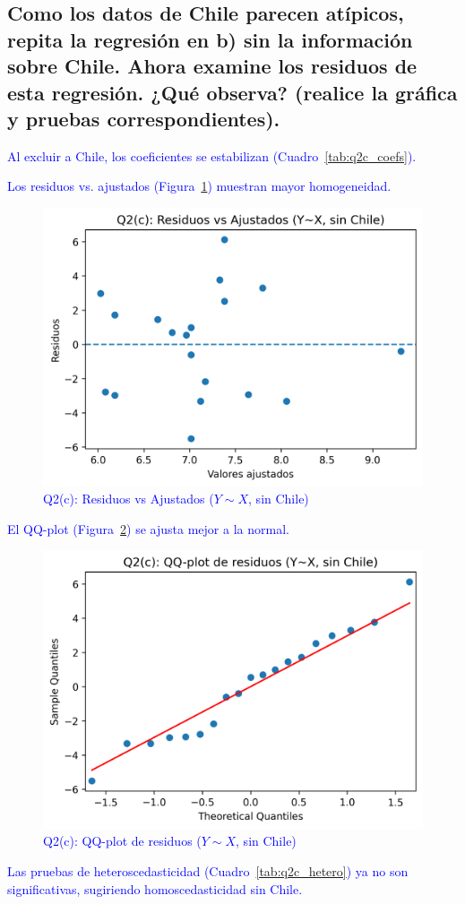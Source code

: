 \documentclass[10pt]{article}
\begin{document}
\subsection{Como los datos de Chile parecen atípicos, repita la regresión en b) sin la información sobre Chile. Ahora examine los residuos de esta regresión. ¿Qué observa? (realice la gráfica y pruebas correspondientes).}
    \textcolor{blue}{
    Al excluir a Chile, los coeficientes se estabilizan (Cuadro~\ref{tab:q2c_coefs}).
    
    Los residuos vs. ajustados (Figura~\ref{fig:q2_c_resid}) muestran mayor homogeneidad.
    \begin{figure}[H]
        \centering
        \includegraphics[width=0.35\linewidth]{../plots/python/ex2/q2_c_resid_vs_fitted_no_chile.png}
        \caption{Q2(c): Residuos vs Ajustados ($Y\sim X$, sin Chile)}
        \label{fig:q2_c_resid}
    \end{figure}
    El QQ-plot (Figura~\ref{fig:q2_c_qq}) se ajusta mejor a la normal.
    \begin{figure}[H]
        \centering
        \includegraphics[width=0.7\linewidth]{../plots/python/ex2/q2_c_resid_qqplot_no_chile.png}
        \caption{Q2(c): QQ-plot de residuos ($Y\sim X$, sin Chile)}
        \label{fig:q2_c_qq}
    \end{figure}
    Las pruebas de heteroscedasticidad (Cuadro~\ref{tab:q2c_hetero}) ya no son significativas, sugiriendo homoscedasticidad sin Chile.
    
    }
\end{document}
